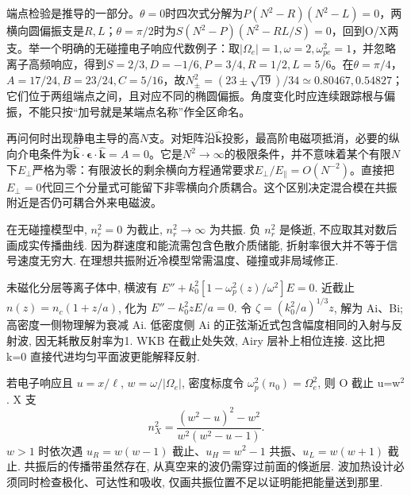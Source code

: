 端点检验是推导的一部分。$\theta=0$时四次式分解为$P(N^2-R)(N^2-L)=0$，两横向圆偏振支是$R,L$；$\theta=\pi/2$时为$S(N^2-P)(N^2-RL/S)=0$，回到O/X两支。举一个明确的无碰撞电子响应代数例子：取$|\Omega_e|=1,\omega=2,\omega_{pe}^2=1$，并忽略离子高频响应，得到$S=2/3,D=-1/6,P=3/4,R=1/2,L=5/6$。在$\theta=\pi/4$，$A=17/24,B=23/24,C=5/16$，故$N_\pm^2=(23\pm\sqrt{19})/34\simeq0.80467,0.54827$；它们位于两组端点之间，且对应不同的椭圆偏振。角度变化时应连续跟踪根与偏振，不能只按“加号就是某端点名称”作全区命名。

再问何时出现静电主导的高$N$支。对矩阵沿$\hat{\mathbf k}$投影，最高阶电磁项抵消，必要的纵向介电条件为$\hat{\mathbf k}\cdot\boldsymbol\epsilon\cdot\hat{\mathbf k}=A=0$。它是$N^2\to\infty$的极限条件，并不意味着某个有限$N$下$E_\perp$严格为零：有限波长的剩余横向方程通常要求$E_\perp/E_\parallel=O(N^{-2})$。直接把$E_\perp=0$代回三个分量式可能留下非零横向介质耦合。这个区别决定混合模在共振附近是否仍可耦合外来电磁波。

在无碰撞模型中, $n_r^2=0$ 为截止, $n_r^2\to\infty$ 为共振. 负 $n_r^2$ 是倏逝, 不应取其对数后画成实传播曲线. 因为群速度和能流需包含色散介质储能, 折射率很大并不等于信号速度无穷大. 在理想共振附近冷模型常需温度、碰撞或非局域修正.

未磁化分层等离子体中, 横波有 $E''+k_0^2[1-\omega_p^2(z)/\omega^2]E=0$. 近截止 $n(z)=n_c(1+z/a)$, 化为 $E''-k_0^2zE/a=0$. 令 $\zeta=(k_0^2/a)^{1/3}z$, 解为 Ai、Bi; 高密度一侧物理解为衰减 Ai. 低密度侧 Ai 的正弦渐近式包含幅度相同的入射与反射波, 因无耗散反射率为1. WKB 在截止处失效, Airy 层补上相位连接. 这比把 k=0 直接代进均匀平面波更能解释反射.

若电子响应且 $u=x/\ell$, $w=\omega/|\Omega_e|$, 密度标度令 $\omega_p^2(n_0)=\Omega_e^2$, 则 O 截止 u=w\ensuremath{{}^{2}}. X 支
\begin{equation}
 n_X^2=\frac{(w^2-u)^2-w^2}{w^2(w^2-u-1)}.
\end{equation}
$w>1$ 时依次遇 $u_R=w(w-1)$ 截止、$u_H=w^2-1$ 共振、$u_L=w(w+1)$ 截止. 共振后的传播带虽然存在, 从真空来的波仍需穿过前面的倏逝层. 波加热设计必须同时检查极化、可达性和吸收, 仅画共振位置不足以证明能把能量送到那里.
